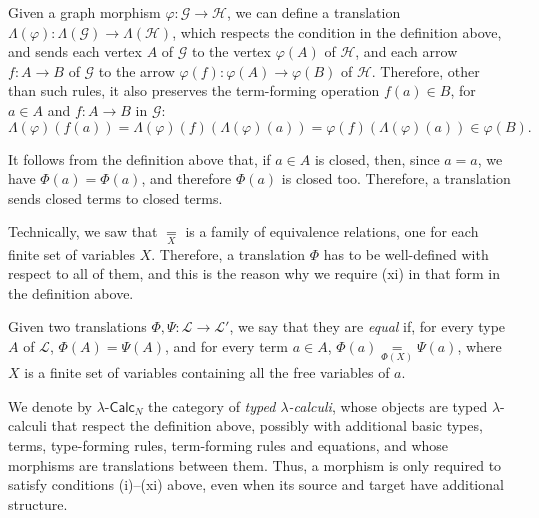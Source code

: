 \begin{example}
    Given a graph morphism $\varphi : \mathcal G \to \mathcal H$, we can define a translation $\Lambda(\varphi) : \Lambda(\mathcal G) \to \Lambda(\mathcal H)$, which respects
    the condition in the definition above, and sends each vertex $A$ of $\mathcal G$ to the vertex $\varphi(A)$ of $\mathcal H$, and each arrow $f : A \to B$ of $\mathcal G$ to the arrow $\varphi(f) : \varphi(A) \to \varphi(B)$ of $\mathcal H$.
    Therefore, other than such rules, it also preserves the term-forming operation $f(a) \in B$, for $a \in A$ and $f : A \to B$ in $\mathcal G$:
    \[ \Lambda(\varphi)(f(a)) = \Lambda(\varphi)(f)(\Lambda(\varphi)(a)) = \varphi(f)(\Lambda(\varphi)(a)) \in \varphi(B). \]
\end{example}

\begin{remark}
    It follows from the definition above that, if $a \in A$ is closed, then, since $a = a$, we have $\Phi(a) = \Phi(a)$, and therefore $\Phi(a)$ is closed too.
    Therefore, a translation sends closed terms to closed terms.
\end{remark}

\begin{remark}
    Technically, we saw that $\underset{X}{=}$ is a family of equivalence relations, one for each finite set of variables $X$. Therefore, a translation $\Phi$ has to be well-defined with respect to all of them,
    and this is the reason why we require (xi) in that form in the definition above.
\end{remark}

\begin{definition}
    Given two translations $\Phi, \Psi : \mathcal L \to \mathcal L'$, we say that they are \emph{equal} if, for every type $A$ of $\mathcal L$, $\Phi(A) = \Psi(A)$, and for every term $a \in A$, $\Phi(a) \underset{\Phi(X)}{=} \Psi(a)$, where $X$ is a finite set of variables containing all the free variables of $a$.
\end{definition}

\begin{definition}\label{idx:lambda-calc-n}
    We denote by $\lambda\text{-}\mathsf{Calc}_N$ the category of \emph{typed $\lambda$-calculi}, whose objects are typed $\lambda$-calculi that respect the definition above, possibly with additional basic types, terms, type-forming rules, term-forming rules and equations, and whose morphisms are translations between them.
    Thus, a morphism is only required to satisfy conditions (i)--(xi) above, even when its source and target have additional structure.
\end{definition}

